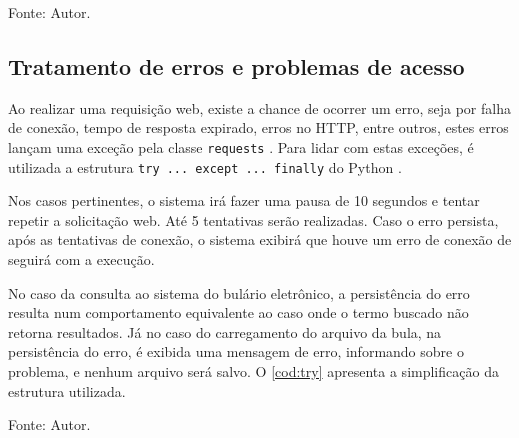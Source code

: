\begin{lstfloat}[htbp]
    \centering
    
    \caption*{Fonte: Autor.}
\end{lstfloat}


\subsection{Tratamento de erros e problemas de acesso}

Ao realizar uma requisição web, existe a chance de ocorrer um erro, seja por falha de conexão, tempo de resposta expirado, erros no HTTP, entre outros, estes erros lançam uma exceção pela classe \lstinline|requests| \cite{reitz2024request}.
Para lidar com estas exceções, é utilizada a estrutura \lstinline|try ... except ... finally| do Python \cite{refsnesdata2024, stack2013tryrequest}.

Nos casos pertinentes, o sistema irá fazer uma pausa de \num{10} segundos e tentar repetir a solicitação web.
Até \num{5} tentativas serão realizadas.
Caso o erro persista, após as tentativas de conexão, o sistema exibirá que houve um erro de conexão de seguirá com a execução.

No caso da consulta ao sistema do bulário eletrônico, a persistência do erro resulta num comportamento equivalente ao caso onde o termo buscado não retorna resultados.
Já no caso do carregamento do arquivo da bula, na persistência do erro, é exibida uma mensagem de erro, informando sobre o problema, e nenhum arquivo será salvo.
O \autoref{cod:try} apresenta a simplificação da estrutura utilizada.


\begin{lstfloat}[htbp]
    \centering
    
    \caption*{Fonte: Autor.}
\end{lstfloat}
